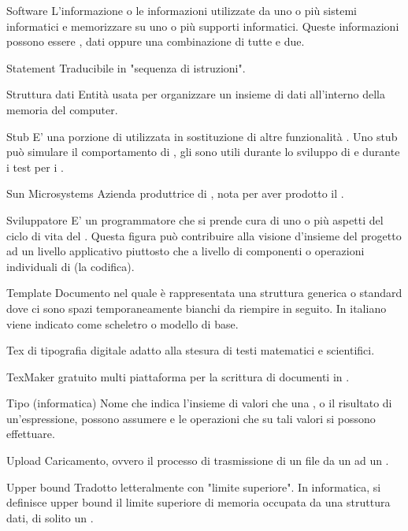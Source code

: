 \elemento
{Software}
{L'informazione o le informazioni utilizzate da uno o più sistemi informatici e memorizzare su uno o più supporti informatici. Queste informazioni possono essere , dati oppure una combinazione di tutte e due.}

\elemento
{Statement}
{Traducibile in "sequenza di istruzioni".}

\elemento
{Struttura dati}
{Entità usata per organizzare un insieme di dati all'interno della memoria del computer.}

\elemento
{Stub}
{E' una porzione di  utilizzata in sostituzione di altre funzionalità . Uno stub può simulare il comportamento di , gli  sono utili durante lo sviluppo di  e durante i test per i .}

\elemento
{Sun Microsystems}
{Azienda produttrice di , nota per aver prodotto il  .}

\elemento
{Sviluppatore}
{E' un programmatore che si prende cura di uno o più aspetti del ciclo di vita del . Questa figura può contribuire alla visione d'insieme del progetto ad un livello applicativo piuttosto che a livello di componenti o operazioni individuali di  (la codifica).}


\elemento
{Template}
{Documento nel quale è rappresentata una struttura generica o standard dove ci sono spazi temporaneamente bianchi da riempire in seguito. In italiano viene indicato come scheletro o modello di base.}

\elemento
{Tex}
{ di tipografia digitale adatto alla stesura di testi matematici e scientifici.}

\elemento
{TexMaker}
{ gratuito multi piattaforma per la scrittura di documenti in .}

\elemento
{Tipo (informatica)}
{Nome che indica l'insieme di valori che una , o il risultato di un'espressione, possono assumere e le operazioni che su tali valori si possono effettuare.}


\elemento
{Upload}
{Caricamento, ovvero il processo di trasmissione di un file da un  ad un .}

\elemento
{Upper bound}
{Tradotto letteralmente con "limite superiore". In informatica, si definisce upper bound il limite superiore di memoria occupata da una struttura dati, di solito un .}

